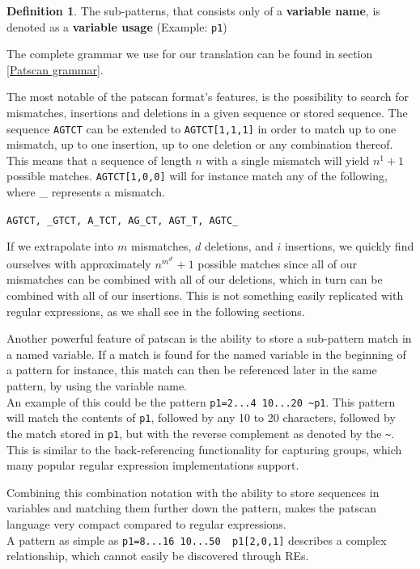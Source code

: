 \documentclass[12pt]{article}
\theoremstyle{definition}
\newtheorem{mydef}{Definition}
\begin{document}
\begin{mydef}
The sub-patterns, that consists only of a \textbf{variable name}, is denoted as a \textbf{variable usage} (Example: \texttt{p1})
\end{mydef}

The complete grammar we use for our translation can be found in section \ref{Patscan grammar}.

The most notable of the patscan format's features, is the possibility to search for mismatches, insertions and deletions in a given sequence or stored sequence. The sequence \texttt{AGTCT} can be extended to \texttt{AGTCT[1,1,1]} in order to match up to one mismatch, up to one insertion, up to one deletion or any combination thereof. \\
This means that a sequence of length $n$ with a single mismatch will yield $n^1+1$ possible matches. \texttt{AGTCT[1,0,0]} will for instance match any of the following, where \_ represents a mismatch.

\texttt{AGTCT, \_GTCT, A\_TCT, AG\_CT, AGT\_T, AGTC\_}

If we extrapolate into $m$ mismatches, $d$ deletions, and $i$ insertions, we quickly find ourselves with approximately $n^{m^{d^{i}}}+1$ possible matches since all of our mismatches can be combined with all of our deletions, which in turn can be combined with all of our insertions. This is not something easily replicated with regular expressions, as we shall see in the following sections.

Another powerful feature of patscan is the ability to store a sub-pattern match in a named variable. If a match is found for the named variable in the beginning of a pattern for instance, this match can then be referenced later in the same pattern, by using the variable name. \\
An example of this could be the pattern \texttt{p1=2...4 10...20 \~{}p1}. This pattern will match the contents of \texttt{p1}, followed by any 10 to 20 characters, followed by the match stored in \texttt{p1}, but with the reverse complement as denoted by the \texttt{\~{}}.\\
This is similar to the back-referencing functionality for capturing groups, which many popular regular expression implementations support.%

Combining this combination notation with the ability to store sequences in variables and matching them further down the pattern, makes the patscan language very compact compared to regular expressions. \\
A pattern as simple as \texttt{p1=8...16 10...50 ~p1[2,0,1]} describes a complex relationship, which cannot easily be discovered through REs.
\end{document}
